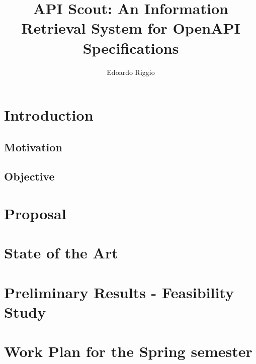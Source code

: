 \documentclass{layout/si-msc-proposal}
\author{Edoardo Riggio}
\title{API Scout: An Information Retrieval System for OpenAPI Specifications}
\begin{document}
    \maketitle


    \tableofcontents
    \listoffigures
    \listoftables
    \newpage


    \section{Introduction}\label{sec:introduction}
    

    \subsection{Motivation}\label{subsec:motivation}
    

    \subsection{Objective}\label{subsec:objective}
    


    \section{Proposal}\label{sec:proposal}


    \section{State of the Art}\label{sec:state-of-the-art}


    \section{Preliminary Results - Feasibility Study}\label{sec:preliminary-results---feasibility-study}


    \section{Work Plan for the Spring semester}\label{sec:work-plan-for-the-spring-semester}
    


    \newpage
    \nocite{*}
    
\end{document}
